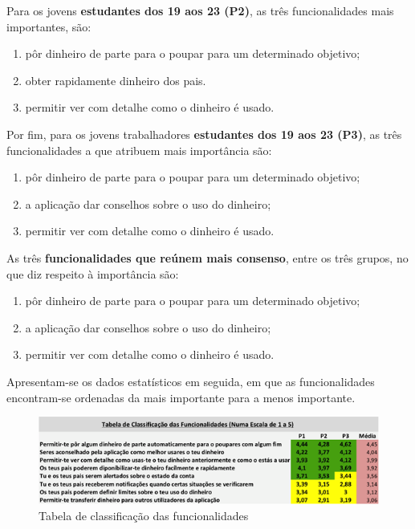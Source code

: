 \documentclass[12pt,a4paper]{article}
\begin{document}
      Para os jovens \textbf{estudantes dos 19 aos 23 (P2)}, as três funcionalidades mais importantes, são:

      \begin{enumerate}
        \item pôr dinheiro de parte para o poupar para um determinado objetivo;
        \item obter rapidamente dinheiro dos pais.
        \item permitir ver com detalhe como o dinheiro é usado.
      \end{enumerate}

      Por fim, para os jovens trabalhadores \textbf{estudantes dos 19 aos 23 (P3)}, as três funcionalidades a que atribuem mais importância são:

      \begin{enumerate}
        \item pôr dinheiro de parte para o poupar para um determinado objetivo;
        \item a aplicação dar conselhos sobre o uso do dinheiro;
        \item permitir ver com detalhe como o dinheiro é usado.
      \end{enumerate}

      As três \textbf{funcionalidades que reúnem mais consenso}, entre os três grupos, no que diz respeito à importância são:

      \begin{enumerate}
        \item pôr dinheiro de parte para o poupar para um determinado objetivo;
        \item a aplicação dar conselhos sobre o uso do dinheiro;
        \item permitir ver com detalhe como o dinheiro é usado.
      \end{enumerate}

      Apresentam-se os dados estatísticos em seguida, em que as funcionalidades encontram-se ordenadas da mais importante para a menos importante.


      \begin{figure}[ht!]
        \centering
          \includegraphics[width=0.7\linewidth]{img/img6}
          \caption{Tabela de classificação das funcionalidades}
          \label{img6}
      \end{figure} 
\end{document}

